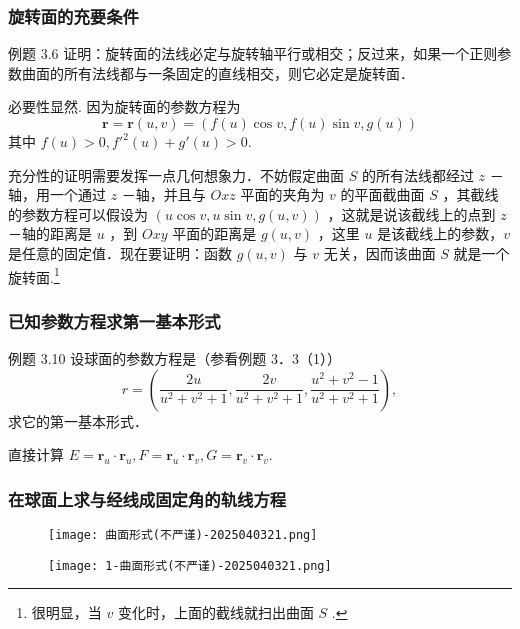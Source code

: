 \subsubsection{旋转面的充要条件}

\begin{exercise}
例题 3.6 证明：旋转面的法线必定与旋转轴平行或相交；反过来，如果一个正则参数曲面的所有法线都与一条固定的直线相交，则它必定是旋转面．
\end{exercise}
必要性显然. 因为旋转面的参数方程为
\[
\boldsymbol{r}=\boldsymbol{r}(u,v)=(f(u)\cos v,f(u)\sin v,g(u))
\]
其中 $f(u)>0,f'^2(u)+g'(u)>0$.

充分性的证明需要发挥一点几何想象力．不妨假定曲面 $S$ 的所有法线都经过 $z$ －轴，用一个通过 $z$ －轴，并且与 $O x z$ 平面的夹角为 $v$ 的平面截曲面 $S$ ，其截线的参数方程可以假设为 $(u \cos v, u \sin v, g(u, v))$ ，这就是说该截线上的点到 $z$ －轴的距离是 $u$ ，到 $O x y$ 平面的距离是 $g(u, v)$ ，这里 $u$ 是该截线上的参数，$v$ 是任意的固定值．现在要证明：函数 $g(u, v)$ 与 $v$ 无关，因而该曲面 $S$ 就是一个旋转面.\footnote{很明显，当 $v$ 变化时，上面的截线就扫出曲面 $S$ .}

\subsubsection{已知参数方程求第一基本形式}

\begin{exercise}
例题 3.10 设球面的参数方程是（参看例题 3．3（1））
\[
r=\left(\frac{2 u}{u^2+v^2+1}, \frac{2 v}{u^2+v^2+1}, \frac{u^2+v^2-1}{u^2+v^2+1}\right),
\]求它的第一基本形式．
\end{exercise}
直接计算 $E=\boldsymbol{r}_{u}\cdot \boldsymbol{r}_{u},F=\boldsymbol{r}_{u}\cdot \boldsymbol{r}_{v},G=\boldsymbol{r}_{v}\cdot \boldsymbol{r}_{v}$.

\subsubsection{在球面上求与经线成固定角的轨线方程}

\begin{figure}[H]
\centering
\texttt{[image: 曲面形式(不严谨)-2025040321.png]}
\label{}
\end{figure}

\begin{figure}[H]
\centering
\texttt{[image: 1-曲面形式(不严谨)-2025040321.png]}
\label{}
\end{figure}

